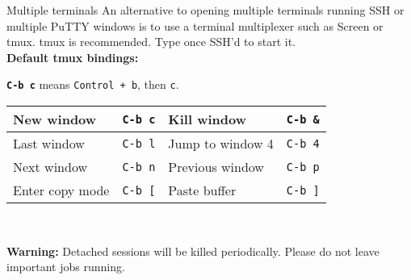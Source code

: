 \begin{block}{Multiple terminals}
  An alternative to opening multiple terminals running SSH or multiple PuTTY windows is to use a terminal multiplexer such as Screen or tmux. tmux is recommended. Type  once SSH'd to start it. \\[0.7em]
  \textbf{Default tmux bindings:} \\
  {\newcommand{\key}[1]{\texttt{C-b #1}}
    \textbf{\key{c}} means \texttt{Control + b}, then \texttt{c}.
    \begin{tabu} to 0.9\linewidth { X[2] X X[2] X }
      \hline
      New window & \key{c} & Kill window & \key{\&} \\ \hline
      Last window & \key{l} & Jump to window 4 & \key{4} \\ \hline
      Next window & \key{n} & Previous window & \key{p} \\ \hline
      Enter copy mode & \key{[} & Paste buffer & \key{]} \\ \hline
    \end{tabu} \\[1em]
  }
  \textbf{Warning:} Detached sessions will be killed periodically. Please do not leave important jobs running.

\end{block}
